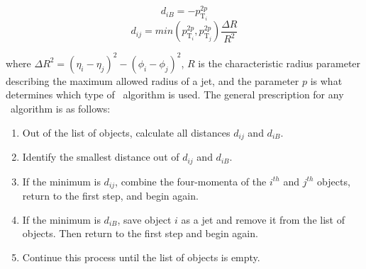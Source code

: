 \begin{equation}
	d_{iB} = -p^{2p}_{\mathrm{T}_{i}}
	\label{diB}
\end{equation} 
\begin{equation}
	d_{ij} = min( p^{2p}_{\mathrm{T}_{i}}, p^{2p}_{\mathrm{T}_{j}})\frac{\Delta R}{R^{2}}
	\label{dij}
\end{equation}

where $\Delta R^{2} = (\eta_{i} - \eta_{j} )^2 - ( \phi_{i} - \phi_{j} )^2$, $R$ is the characteristic radius parameter describing the maximum allowed radius of a jet, and the parameter $p$ is what determines which type of \kt\ algorithm is used. The general prescription for any \kt\ algorithm is as follows:

\begin{enumerate}
	\item Out of the list of objects, calculate all distances $d_{ij}$ and $d_{iB}$.
	\item Identify the smallest distance out of $d_{ij}$ and $d_{iB}$.
	\item If the minimum is $d_{ij}$, combine the four-momenta of the $i^{th}$ and $j^{th}$ objects, return to the first step, and begin again.
	\item If the minimum is $d_{iB}$, save object $i$ as a jet and remove it from the list of objects. Then return to the first step and begin again.
	\item Continue this process until the list of objects is empty.
\end{enumerate}

